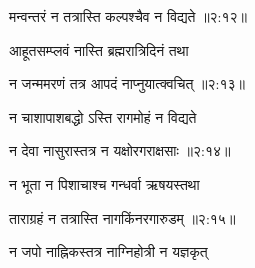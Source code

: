 
{\devanagarifont मन्वन्तरं न तत्रास्ति कल्पश्चैव न विद्यते {॥२:१२॥} \veg\dontdisplaylinenum }%

{\devanagarifont आहूतसम्प्लवं नास्ति ब्रह्मरात्रिदिनं तथा \thinspace{\dandab} \dontdisplaylinenum }%


{\devanagarifont न जन्ममरणं तत्र आपदं नाप्नुयात्क्वचित् {॥२:१३॥} \veg\dontdisplaylinenum }%

{\devanagarifont न चाशापाशबद्धो ऽस्ति रागमोहं न विद्यते \thinspace{\dandab} \dontdisplaylinenum }%


{\devanagarifont न देवा नासुरास्तत्र न यक्षोरगराक्षसाः {॥२:१४॥} \veg\dontdisplaylinenum }%

{\devanagarifont न भूता न पिशाचाश्च गन्धर्वा ऋषयस्तथा \thinspace{\dandab} \dontdisplaylinenum }%


{\devanagarifont ताराग्रहं न तत्रास्ति नागकिंनरगारुडम् {॥२:१५॥} \veg\dontdisplaylinenum }%
 
{\devanagarifont न जपो नाह्निकस्तत्र नाग्निहोत्री न यज्ञकृत् \thinspace{\dandab} \dontdisplaylinenum }%

